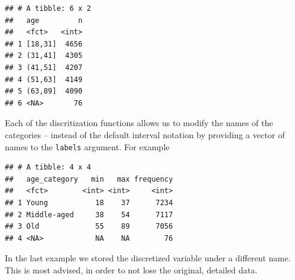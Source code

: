 \documentclass[]{tufte-book}
\newenvironment{Shaded}{}{}
\newcommand{\DataTypeTok}[1]{\textcolor[rgb]{0.56,0.13,0.00}{#1}}
\newcommand{\DecValTok}[1]{\textcolor[rgb]{0.25,0.63,0.44}{#1}}
\newcommand{\KeywordTok}[1]{\textcolor[rgb]{0.00,0.44,0.13}{\textbf{#1}}}
\newcommand{\NormalTok}[1]{#1}
\newcommand{\OperatorTok}[1]{\textcolor[rgb]{0.40,0.40,0.40}{#1}}
\newcommand{\StringTok}[1]{\textcolor[rgb]{0.25,0.44,0.63}{#1}}
\begin{document}
\begin{Shaded}
\end{Shaded}

\begin{verbatim}
## # A tibble: 6 x 2
##   age         n
##   <fct>   <int>
## 1 [18,31]  4656
## 2 (31,41]  4305
## 3 (41,51]  4207
## 4 (51,63]  4149
## 5 (63,89]  4090
## 6 <NA>       76
\end{verbatim}

Each of the discritization functions allows us to modify the names of the categories -- instead of the default interval notation by providing a vector of names to the \texttt{labels} argument. For example

\begin{Shaded}
\end{Shaded}

\begin{verbatim}
## # A tibble: 4 x 4
##   age_category   min   max frequency
##   <fct>        <int> <int>     <int>
## 1 Young           18    37      7234
## 2 Middle-aged     38    54      7117
## 3 Old             55    89      7056
## 4 <NA>            NA    NA        76
\end{verbatim}

In the last example we stored the discretized variable under a different name. This is most advised, in order to not lose the original, detailed data.
\end{document}

